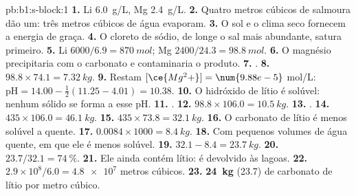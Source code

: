 \begin{solution}{pb:b1:s-block:1}
\textbf{1.} Li \qty{6.0}{g/L}, Mg \qty{2.4}{g/L}.
\textbf{2.} Quatro metros cúbicos de salmoura dão um: três metros cúbicos
de água evaporam.
\textbf{3.} O sol e o clima seco fornecem a energia de graça.
\textbf{4.} O cloreto de sódio, de longe o sal mais abundante, satura
primeiro.
\textbf{5.} Li $6000/6.9 = \qty{870}{mol}$; Mg $2400/24.3 = \qty{98.8}{mol}$.
\textbf{6.} O magnésio precipitaria com o carbonato e contaminaria o
produto.
\textbf{7.} .
\textbf{8.} $98.8 \times 74.1 = \qty{7.32}{kg}$.
\textbf{9.} Restam $[\ce{Mg^2+}] = \num{9.88e-5}$ mol/L: $\mathrm{pH} = 14.00 -
\frac12(11.25 - 4.01) = 10.38$.
\textbf{10.} O hidróxido de lítio é solúvel: nenhum sólido se forma a esse pH.
\textbf{11.} .
\textbf{12.} $98.8 \times 106.0 = \qty{10.5}{kg}$.
\textbf{13.} .
\textbf{14.} $435 \times 106.0 = \qty{46.1}{kg}$.
\textbf{15.} $435 \times 73.8 = \qty{32.1}{kg}$.
\textbf{16.} O carbonato de lítio é menos solúvel a quente.
\textbf{17.} $0.0084 \times 1000 = \qty{8.4}{kg}$.
\textbf{18.} Com pequenos volumes de água quente, em que ele é menos
solúvel.
\textbf{19.} $32.1 - 8.4 = \qty{23.7}{kg}$.
\textbf{20.} $23.7/32.1 = \qty{74}{\percent}$.
\textbf{21.} Ele ainda contém lítio: é devolvido às lagoas.
\textbf{22.} $2.9 \times 10^8/6.0 = \num{4.8e7}$ metros cúbicos.
\textbf{23.} \textbf{\qty{24}{kg}} (23.7) de carbonato de lítio por metro
cúbico.
\end{solution}
